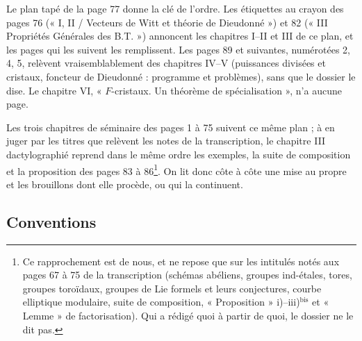 \documentclass[11pt,a4paper]{article}
\begin{document}
Le plan tapé de la page 77 donne la clé de l'ordre. Les étiquettes au crayon
des pages 76 (« I, II / Vecteurs de Witt et théorie de Dieudonné ») et 82
(« III Propriétés Générales des B.T. ») annoncent les chapitres I--II et III
de ce plan, et les pages qui les suivent les remplissent. Les pages 89 et
suivantes, numérotées 2, 4, 5, relèvent vraisemblablement des chapitres
IV--V (puissances divisées et cristaux, foncteur de Dieudonné : programme et
problèmes), sans que le dossier le dise. Le chapitre VI, « $F$-cristaux. Un
théorème de spécialisation », n'a aucune page.

Les trois chapitres de séminaire des pages 1 à 75 suivent ce même plan ; à
en juger par les titres que relèvent les notes de la transcription, le
chapitre III dactylographié reprend dans le même ordre les exemples, la
suite de composition et la proposition des pages 83 à 86\footnote{Ce
rapprochement est de nous, et ne repose que sur les intitulés notés aux
pages 67 à 75 de la transcription (schémas abéliens, groupes ind-étales,
tores, groupes toroïdaux, groupes de Lie formels et leurs conjectures,
courbe elliptique modulaire, suite de composition, « Proposition »
i)--iii)$^{\mathrm{bis}}$ et « Lemme » de factorisation). Qui a rédigé
quoi à partir de quoi, le dossier ne le dit pas.}. On lit donc côte à côte
une mise au propre et les brouillons dont elle procède, ou qui la
continuent.

\subsection*{Conventions}
\end{document}

